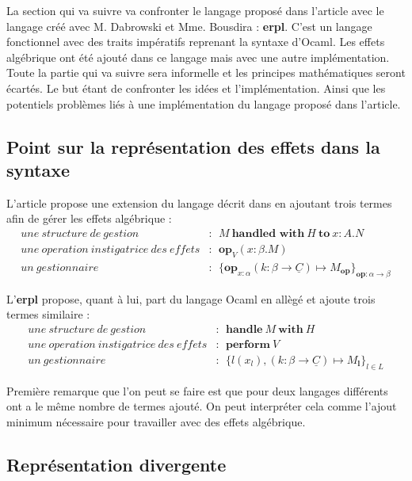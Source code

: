 La section qui va suivre va confronter le langage proposé dans l'article avec 
le langage créé avec M. Dabrowski et Mme. Bousdira : \textbf{erpl}. C'est un langage
fonctionnel avec des traits impératifs reprenant la syntaxe d'Ocaml. Les effets algébrique
ont été ajouté dans ce langage mais avec une autre implémentation. Toute la partie qui va
suivre sera informelle et les principes mathématiques seront écartés. Le but étant de confronter
les idées et l'implémentation. Ainsi que les potentiels problèmes liés à une implémentation du
langage proposé dans l'article.

\subsection{Point sur la représentation des effets dans la syntaxe}

L'article propose une extension du langage décrit dans \cite{DBLP:journals/lisp/Levy06} en ajoutant trois termes afin de gérer les effets algébrique :
\begin{align*}
    une~structure~de~gestion &:~~M~\textbf{handled~with}~H~\textbf{to}~x:A.N\\
    une~operation~instigatrice~des~effets &:~~\textbf{op}_V(x:\beta.M)\\
    un~gestionnaire &:~~\{\textbf{op}_{x:\alpha}(k:\beta \rightarrow \underline{C}) \mapsto M_\textbf{op}\}_{\textbf{op}:\alpha \rightarrow \beta}
\end{align*}

L'\textbf{erpl} propose, quant à lui, part du langage Ocaml en allègé et ajoute trois termes similaire :
\begin{align*}
    une~structure~de~gestion &:~~\textbf{handle}~M~\textbf{with}~H\\
    une~operation~instigatrice~des~effets &:~~\textbf{perform}~V\\
    un~gestionnaire &:~~\{l(x_l),(k:\beta \rightarrow \underline{C}) \mapsto M_\textbf{l}\}_{l \in L}
\end{align*}

Première remarque que l'on peut se faire est que pour deux langages différents ont a le même nombre de 
termes ajouté. On peut interpréter cela comme l'ajout minimum nécessaire pour travailler avec des effets
algébrique.

\subsection{Représentation divergente}

